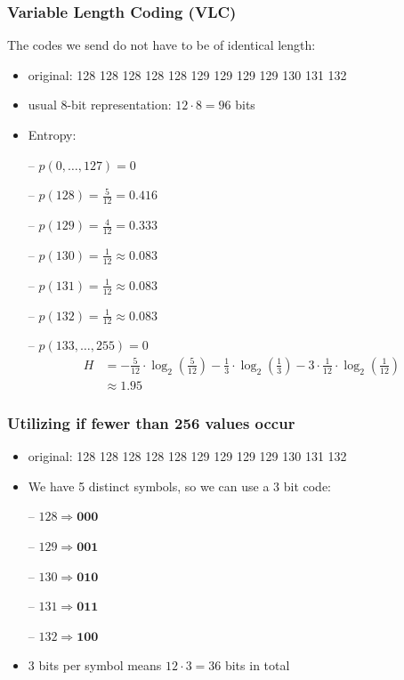 \documentclass{beamer}
\begin{document}
\begin{frame}
\frametitle{Variable Length Coding (VLC)}
The codes we send do not have to be of identical length:

\begin{itemize}
\item original: 128 128 128 128 128 129 129 129 129 130 131 132
\item usual 8-bit representation: $12\cdot 8 = 96$ bits

\item Entropy: 

-- $p(0,\dots,127)=0$

-- $p(128)=\frac{5}{12}=0.416$

-- $p(129)=\frac{4}{12}=0.333$

-- $p(130)=\frac{1}{12}\approx 0.083$

-- $p(131)=\frac{1}{12}\approx 0.083$

-- $p(132)=\frac{1}{12}\approx 0.083$

-- $p(133,\dots,255)=0$
\begin{align*}
H &= -\frac{5}{12}\cdot \log_2(\frac{5}{12}) - \frac{1}{3}\cdot \log_2(\frac{1}{3}) 
- 3\cdot \frac{1}{12}\cdot \log_2(\frac{1}{12}) 
\\
&\approx 1.95
\end{align*}
\end{itemize}
\end{frame}

\begin{frame}
\frametitle{Utilizing if fewer than 256 values occur}
\begin{itemize}
\item original: 128 128 128 128 128 129 129 129 129 130 131 132
\item We have 5 distinct symbols, so we can use a 3 bit code:

-- $128 \Rightarrow \mathbf{000}$

-- $129 \Rightarrow \mathbf{001}$

-- $130 \Rightarrow \mathbf{010}$

-- $131 \Rightarrow \mathbf{011}$

-- $132 \Rightarrow \mathbf{100}$

\item $3$ bits per symbol means $12\cdot 3 = 36$ bits in total
\end{itemize}
\end{frame}
\end{document}
